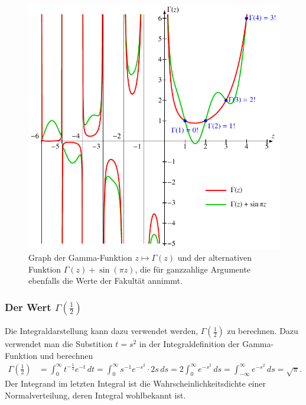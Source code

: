 \begin{figure}
\centering
\includegraphics{chapters/040-rekursion/images/gammaplot.pdf}
\caption{Graph der Gamma-Funktion $z\mapsto\Gamma(z)$ und der alternativen
Funktion $\Gamma(z)+\sin(\pi z)$, die für ganzzahlige Argumente ebenfalls
die Werte der Fakultät annimmt.
\label{buch:rekursion:fig:gamma}}
\end{figure}

%
%
\subsubsection{Der Wert $\Gamma(\frac12)$}
Die Integraldarstellung kann dazu verwendet werden, $\Gamma(\frac12)$ 
zu berechnen.
%
Dazu verwendet man die Substition $t=s^2$ in der Integraldefinition
der Gamma-Funktion und berechnen
\begin{align}
\Gamma({\textstyle\frac12})
&=
\int_0^\infty t^{-\frac12} e^{-t}\,dt
=
\int_0^\infty s^{-1} e^{-s^2}\cdot 2s\,ds
=
2\int_0^\infty e^{-s^2}\,ds
=
\int_{-\infty}^\infty e^{-s^2}\,ds
=
\sqrt{\pi}.
\label{buch:rekursion:gamma:wert12}
\end{align}
Der Integrand im letzten Integral ist die Wahrscheinlichkeitsdichte
einer Normalverteilung, deren Integral wohlbekannt ist.

